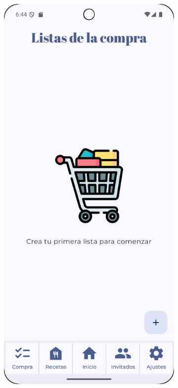 \begin{figure}[H]
\begin{subfigure}[b]{0.3\textwidth}
      \includegraphics[width=\textwidth]{./img/manual/pinche_empty_shopping_list.png}

\end{subfigure}
\end{figure}
